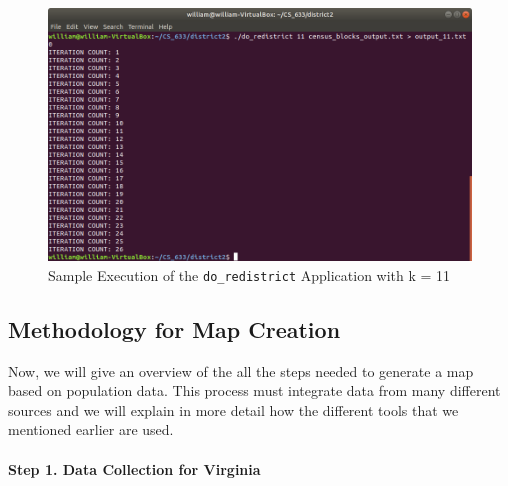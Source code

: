 \documentclass[11pt]{article}
\begin{document}
\begin{figure}[H]
	\centering
	\includegraphics[width=.55\textwidth]{do_redistrict}
	\caption{Sample Execution of the \texttt{do\_redistrict} Application with k = 11}
	\label{fig:doredistrict}
\end{figure}


\subsection{Methodology for Map Creation}

Now, we will give an overview of the all the steps needed to generate a map based on population data. This process must integrate data from many different sources and we will explain in more detail how the different tools that we mentioned earlier are used.

\paragraph{Step 1. Data Collection for Virginia}
\end{document}
